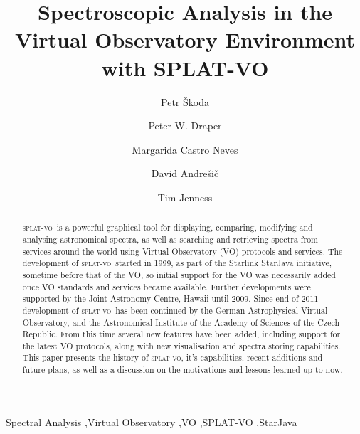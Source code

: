 \documentclass[final,authoryear,5p,times,twocolumn]{elsarticle}
\newcommand{\splatvo}{\textsc{splat-vo}}
\begin{document}
\begin{frontmatter}

\title{Spectroscopic Analysis in the Virtual Observatory Environment with SPLAT-VO}

\author[OND]{Petr \v{S}koda}
\author[DUR]{Peter W. Draper}
\author[HDB]{Margarida Castro Neves}
\author[VSB]{David Andre\v{s}i\v{c}}
\author[COR]{Tim Jenness}

\address[OND]{Astronomical Institute of the Academy of Sciences,Fri\v{c}ova~298, 251\,65, Ond\v{r}ejov, Czech Republic}
\address[DUR]{Department of Physics, Institute for Computational
Cosmology, University of Durham, South Road, Durham DH1 3LE, UK}
\address[HDB]{Universit\"a{}t Heidelberg, Astronomisches Rechen-Institut,
M\"o{}nchhofstra\ss{}e 12--14, 69120 Heidelberg, Germany}
\address[VSB]{Department of Computer Science, Faculty of Electrical
Engineering and Computer Science, V\v{S}B --- Technical University of Ostrava\\
 17. listopadu 15, 708 33 Ostrava-Poruba, Czech Republic}
\address[COR]{Department of Astronomy, Cornell University, Ithaca, NY 14853, USA}


\begin{abstract}
  \splatvo\ is a powerful graphical tool for displaying, comparing, modifying
  and analysing astronomical spectra, as well as searching and retrieving
  spectra from services around the world using Virtual Observatory (VO)
  protocols and services. The development of \splatvo\ started in 1999, as part
  of the Starlink StarJava initiative, sometime before that of the VO, so
  initial support for the VO was necessarily added once VO standards and
  services became available. Further developments were supported by
  the Joint Astronomy Centre,
  Hawaii until 2009. Since end of 2011 development of \splatvo\ has been
  continued by the German Astrophysical Virtual Observatory, and the
  Astronomical Institute of the Academy of Sciences of the Czech Republic.
  From this time several new features have been added, including support for
  the latest VO protocols, along with new visualisation and spectra storing
  capabilities. This paper presents the history of \splatvo, it's
  capabilities, recent additions and future plans, as well as a discussion on
  the motivations and lessons learned up to now.
\end{abstract}
\begin{keyword}
Spectral Analysis \sep Virtual Observatory \sep VO \sep SPLAT-VO \sep StarJava
\end{keyword}
\end{frontmatter}
\end{document}

